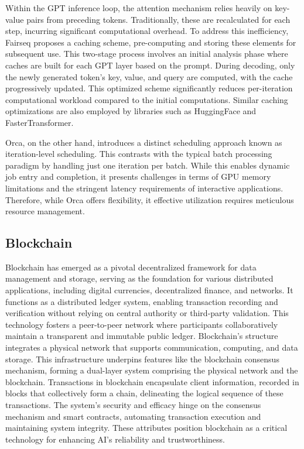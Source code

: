 Within the GPT inference loop, the attention mechanism relies heavily on key-value pairs from preceding tokens. Traditionally, these are recalculated for each step, incurring significant computational overhead. To address this inefficiency, Fairseq \cite{ott2019fairseq} proposes a caching scheme, pre-computing and storing these elements for subsequent use. This two-stage process involves an initial analysis phase where caches are built for each GPT layer based on the prompt. During decoding, only the newly generated token's key, value, and query are computed, with the cache progressively updated. This optimized scheme significantly reduces per-iteration computational workload compared to the initial computations. Similar caching optimizations are also employed by libraries such as HuggingFace\cite{wolf2019huggingface} and FasterTransformer\cite{chelba2020faster}.

Orca\cite{yu2022orca}, on the other hand, introduces a distinct scheduling approach known as iteration-level scheduling. This contrasts with the typical batch processing paradigm by handling just one iteration per batch. While this enables dynamic job entry and completion, it presents challenges in terms of GPU memory limitations and the stringent latency requirements of interactive applications. Therefore, while Orca offers flexibility, it effective utilization requires meticulous resource management.

\subsection{Blockchain}

Blockchain has emerged as a pivotal decentralized framework for data management and storage, serving as the foundation for various distributed applications, including digital currencies\cite{nakamoto2008bitcoin}, decentralized finance,  and networks\cite{luo2023escm}. It functions as a distributed ledger system, enabling transaction recording and verification without relying on central authority or third-party validation. This technology fosters a peer-to-peer network\cite{zyskind2015decentralizing} where participants collaboratively maintain a transparent and immutable public ledger\cite{cao2022blockchain}. Blockchain's structure integrates a physical network that supports communication, computing, and data storage. This infrastructure underpins features like the blockchain consensus mechanism, forming a dual-layer system comprising the physical network and the blockchain. Transactions in blockchain encapsulate client information, recorded in blocks that collectively form a chain, delineating the logical sequence of these transactions. The system's security and efficacy hinge on the consensus mechanism and smart contracts, automating transaction execution and maintaining system integrity. These attributes position blockchain as a critical technology for enhancing AI's reliability and trustworthiness.
